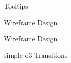 \documentclass[a4paper,11pt,titlepage]{article}
\begin{document}
	\begin{figure}[H]
    			\caption{Tooltips}%
	\end{figure}	
	
	\begin{figure}[H]
    			\caption{Wireframe Design}%
	\end{figure}	


	\begin{figure}[H]
    			\caption{Wireframe Design}%
	\end{figure}				
	
	\begin{figure}[H]
    			\caption{simple d3 Transitions}%
	\end{figure}		
	
\end{document}
